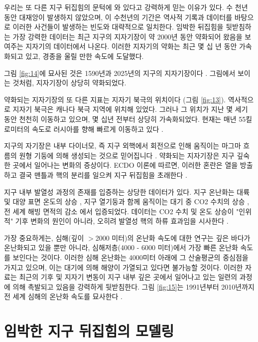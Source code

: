 \documentclass[10pt,twocolumn,letterpaper]{article}
\begin{document}
우리는 또 다른 지구 뒤집힘의 문턱에 와 있다고 강력하게 믿는 이유가 있다. 수 천년 동안 대재앙이 발생하지 않았으며, 이 수천년의 기간은 역사적 기록과 데이터를 바탕으로 이러한 사건들이 발생하는 빈도와 대략적으로 일치한다. 임박한 뒤집힘을 뒷받침하는 가장 강력한 데이터는 최근 지구의 지자기장이 약 2000년 동안 약화되어 왔음을 보여주는 지자기의 데이터에서 나온다. 이러한 지자기의 약화는 최근 몇 십 년 동안 가속화되고 있고, 경종을 울릴 만한 속도에 도달했다.

그림 \ref{fig:14}에 묘사된 것은 1590년과 2025년의 지구의 지자기장이다 \cite{125,126}. 그림에서 보이는 것처럼, 지자기장이 상당히 약화되었다.

약화되는 지자기장의 또 다른 지표는 지자기 북극의 위치이다 (그림 \ref{fig:13}). 역사적으로 지자기 북극은 캐나다 북극 지역에 위치해 있었다. 그러나 그 위치가 지난 몇 세기 동안 천천히 이동하고 있으며, 몇 십년 전부터 상당히 가속화되었다. 현재는 매년 55킬로미터의 속도로 러시아를 향해 빠르게 이동하고 있다 \cite{124}.



지구의 자기장은 내부 다이너모, 즉 지구 외핵에서 회전으로 인해 움직이는 마그마 흐름의 원형 기둥에 의해 생성되는 것으로 믿어집니다 \cite{123}. 약화되는 지자기장은 지구 깊숙한 곳에서 일어나는 변화의 증상이다. ECDO 이론에 따르면, 이러한 혼란은 열을 방출하고 결국 맨틀과 핵의 분리를 일으켜 지구 뒤집힘을 초래한다 \cite{1}.

지구 내부 발열성 과정의 존재를 입증하는 상당한 데이터가 있다. 지구 온난화는 대륙 및 대양 표면 온도의 상승 \cite{127,128}, 지구 열기둥과 함께  움직이는 대기 중 CO2 수치의 상승 \cite{129,130}, 전 세계 해빙 면적의 감소 \cite{131}에서 입증되었다. 데이터는 CO2 수치 및 온도 상승이 "인위적" 기후 변화의 원인이 아니라, 오히려 발열성 핵의 하류 효과임을 시사한다 \cite{129}.

가장 중요하게는, 심해(깊이 $>$2000 미터)의 온난화 속도에 대한 연구는 깊은 바다가 온난화되고 있을 뿐만 아니라, 심해저층(4000 - 6000 미터)에서 가장 빠른 온난화 속도를 보인다는 것이다. 이러한 심해 온난화는 4000미터 아래에 그 산술평균의 중심점을 가지고 있으며\cite{132,129}, 이는 대기에 의해  해양이 가열되고 있다면 불가능할 것이다. 이러한 자료는 최근의  기후 및 지자기 변동이 지구 내부 깊은 곳에서 일어나고 있는 일련의 과정에 의해 촉발되고 있음을 강력하게 뒷받침한다. 그림 \ref{fig:15}는 1991년부터 2010년까지 전 세계 심해의 온난화 속도를 묘사한다 \cite{132}.

\section{임박한 지구 뒤집힘의 모델링}
\end{document}
